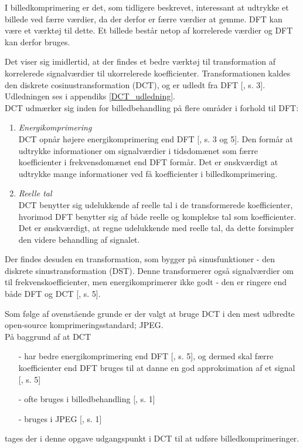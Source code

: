 I billedkomprimering er det, som tidligere beskrevet, interessant at udtrykke et billede ved færre værdier, da der derfor er færre værdier at gemme. DFT kan være et værktøj til dette. Et billede  består netop af korrelerede værdier og DFT kan derfor bruges.

Det viser sig imidlertid, at der findes et bedre værktøj til transformation af korrelerede signalværdier til ukorrelerede koefficienter. Transformationen kaldes den diskrete cosinustransformation (DCT), og er udledt fra DFT [\citet{dft_argument}, s. 3]. Udledningen ses i appendiks \vref{DCT_udledning}.\\
DCT udmærker sig inden for billedbehandling på flere områder i forhold til DFT:
\begin{enumerate}
\item \textit{Energikomprimering}\\
	DCT opnår højere energikomprimering end DFT [\citet{smcnus_energy}, s. 3 og 5]. Den formår at udtrykke informationer om signalværdier i tidsdomænet som færre koefficienter i frekvensdomænet end DFT formår. Det er ønskværdigt at udtrykke mange informationer ved få koefficienter i billedkomprimering.
\item \textit{Reelle tal}\\
	DCT benytter sig udelukkende af reelle tal i de transformerede koefficienter, hvorimod DFT benytter sig af både reelle og komplekse tal som koefficienter. Det er ønskværdigt, at regne udelukkende med reelle tal, da dette forsimpler den videre behandling af signalet.
\end{enumerate}
Der findes desuden en transformation, som bygger på sinusfunktioner - den diskrete sinustransformation (DST). Denne transformerer også signalværdier om til frekvenskoefficienter, men energikomprimerer ikke godt - den er ringere end både DFT og DCT [\citet{smcnus_energy}, s. 5].

Som følge af ovenstående grunde er der valgt at bruge DCT i den mest udbredte open-source komprimeringsstandard; JPEG.\\
På baggrund af at DCT
\begin{itemize}
\item[-] har bedre energikomprimering end DFT [\citet{smcnus_energy}, s. 5], og dermed skal færre koefficienter end DFT bruges til at danne en god approksimation af et signal [\citet{dft_argument}, s. 5]
\item[-] ofte bruges i billedbehandling [\citet{DTT}, s. 1]
\item[-] bruges i JPEG [\citet{dft_argument}, s. 1]
\end{itemize}
tages der i denne opgave udgangspunkt i DCT til at udføre billedkomprimeringer.
